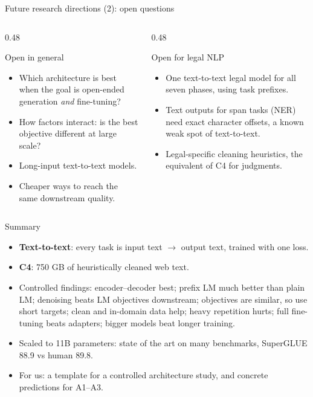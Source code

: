 \documentclass[aspectratio=169,11pt]{beamer}
\begin{document}
\begin{frame}{Future research directions (2): open questions}
  \begin{columns}[T]
    \begin{column}{0.48\textwidth}
      \begin{block}{Open in general}
        \small
        \begin{itemize}
          \item Which architecture is best when the goal is open-ended generation \emph{and} fine-tuning?
          \item How factors interact: is the best objective different at large scale?
          \item Long-input text-to-text models.
          \item Cheaper ways to reach the same downstream quality.
        \end{itemize}
      \end{block}
    \end{column}
    \begin{column}{0.48\textwidth}
      \begin{exampleblock}{Open for legal NLP}
        \small
        \begin{itemize}
          \item One text-to-text legal model for all seven phases, using task prefixes.
          \item Text outputs for span tasks (NER) need exact character offsets, a known weak spot of text-to-text.
          \item Legal-specific cleaning heuristics, the equivalent of C4 for judgments.
        \end{itemize}
      \end{exampleblock}
    \end{column}
  \end{columns}
\end{frame}

\begin{frame}{Summary}
  \begin{itemize}
    \item \textbf{Text-to-text}: every task is input text $\to$ output text, trained with one loss.
    \item \textbf{C4}: 750 GB of heuristically cleaned web text.
    \item Controlled findings: encoder--decoder best; prefix LM much better than plain LM; denoising beats LM objectives downstream; objectives are similar, so use short targets; clean and in-domain data help; heavy repetition hurts; full fine-tuning beats adapters; bigger models beat longer training.
    \item Scaled to 11B parameters: state of the art on many benchmarks, SuperGLUE 88.9 vs human 89.8.
    \item For us: a template for a controlled architecture study, and concrete predictions for A1--A3.
  \end{itemize}
\end{frame}
\end{document}
